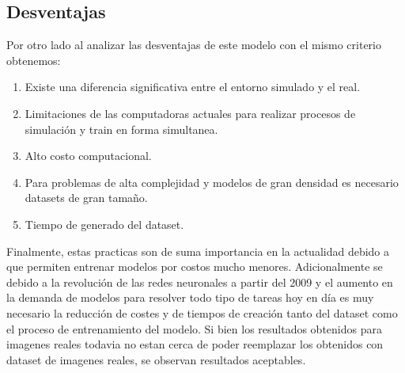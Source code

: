 \documentclass[]{IEEEtran}
\begin{document}
    \subsection{Desventajas}
    
    Por otro lado al analizar las desventajas de este modelo con el mismo criterio obtenemos:
    
    \begin{enumerate}
        \item Existe una diferencia significativa entre el entorno simulado y el real.
        \item Limitaciones de las computadoras actuales para realizar procesos de simulación y train en forma simultanea.
        \item Alto costo computacional.
        \item Para problemas de alta complejidad y modelos de gran densidad es necesario datasets de gran tamaño.
        \item Tiempo de generado del dataset.
    \end{enumerate}


    Finalmente, estas practicas son de suma importancia en la actualidad debido a que permiten entrenar modelos por costos mucho menores. 
    Adicionalmente se debido a la revolución de las redes neuronales a partir del 2009 y el aumento en la demanda de modelos para resolver todo 
    tipo de tareas hoy en día es muy necesario la reducción de costes y de tiempos de creación tanto del dataset como el proceso de entrenamiento del modelo. 
    Si bien los resultados obtenidos para imagenes reales todavia no estan cerca de poder reemplazar los obtenidos con dataset de imagenes reales, se 
    observan resultados aceptables.


    
    
\end{document}
